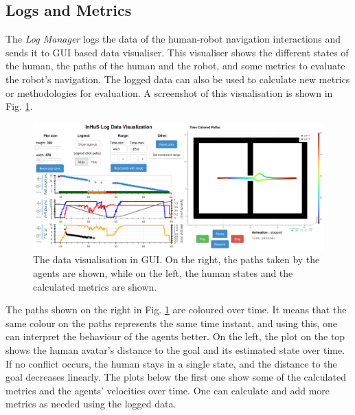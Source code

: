 \subsection{Logs and Metrics}
The \textit{Log Manager} logs the data of the human-robot navigation interactions and sends it to GUI based data visualiser. This visualiser shows the different states of the human, the paths of the human and the robot, and some metrics to evaluate the robot's navigation. The logged data can also be used to calculate new metrics or methodologies for evaluation. A screenshot of this visualisation is shown in Fig. \ref{fig:gui_inhus}.
\begin{figure}[!ht]
    \centering
    \includegraphics[width=0.9\columnwidth]{images/appendix/gui_bis_bis.png}
    \caption{The data visualisation in GUI. On the right, the paths taken by the agents are shown, while on the left, the human states and the calculated metrics are shown.}
    \label{fig:gui_inhus}
\end{figure}
The paths shown on the right in Fig. \ref{fig:gui_inhus} are coloured over time. It means that the same colour on the paths represents the same time instant, and using this, one can interpret the behaviour of the agents better. On the left, the plot on the top shows the human avatar's distance to the goal and its estimated state over time. If no conflict occurs, the human stays in a single state, and the distance to the goal decreases linearly. The plots below the first one show some of the calculated metrics and the agents' velocities over time. One can calculate and add more metrics as needed using the logged data.

